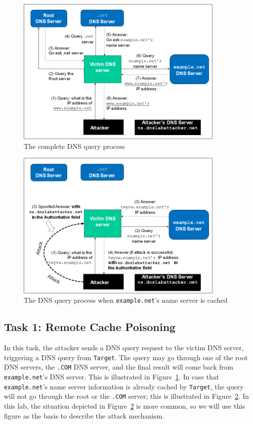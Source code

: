 \begin{figure}[!htb]
\centering
\includegraphics*[width=0.9\textwidth]{DNS_Remote_Flow1.png}
\caption{The complete DNS query process} 
\label{fig:flow_diagram1}
\end{figure}


\begin{figure}[!htb]
\centering
\includegraphics*[width=0.9\textwidth]{DNS_Remote_Flow2.png}
\caption{The DNS query process when {\tt example.net}'s name server is cached}
\label{fig:flow_diagram2}
\end{figure}


\subsection{Task 1: Remote Cache Poisoning}

In this task, the attacker sends a DNS query request to the victim
DNS server, triggering a DNS query from {\tt Target}. The
query may go through one of the root DNS servers, the {\tt .COM} DNS server, and 
the final result will come back from {\tt example.net}'s DNS server. This 
is illustrated in Figure~\ref{fig:flow_diagram1}. In case that 
{\tt example.net}'s name server information is already cached by 
{\tt Target}, the query will not go through the root or the 
{\tt .COM} server; this is illustrated in Figure~\ref{fig:flow_diagram2}.
In this lab, the situation depicted in  Figure~\ref{fig:flow_diagram2} is 
more common, so we will use this figure as the basis to describe 
the attack mechanism.

